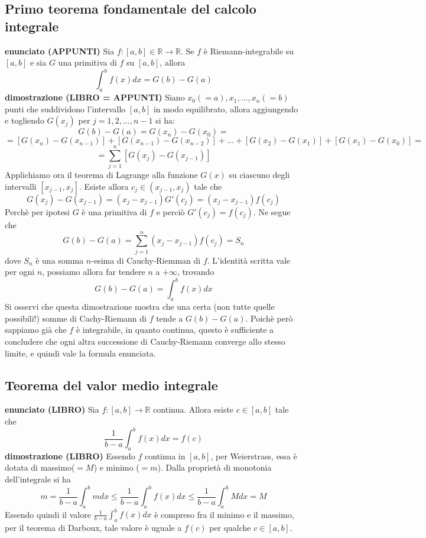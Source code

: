 \documentclass[a4paper, 9pt]{report}
\begin{document}
\newpage
\subsection*{Primo teorema fondamentale del calcolo integrale}
\textbf{enunciato (APPUNTI)}\newline
Sia $f : [a,b] \in \mathbb{R} \rightarrow \mathbb{R}$. Se $f$ è Riemann-integrabile su $[a,b]$ e sia $G$ una primitiva di $f$ su $[a,b]$, allora
\[
    \int_{a}^{b}f(x) dx = G(b)-G(a)
\]
\textbf{dimostrazione (LIBRO = APPUNTI)}\newline
Siano $x_0 (=a), x_1, \dots, x_n (=b)$ punti che suddividono l'intervallo $[a,b]$ in modo equilibrato, allora aggiungendo e togliendo $G(x_j)$ per $j = 1,2,\dots,n-1$ si ha:
\[
    G(b) - G(a) = G(x_n) - G(x_0) =
\]
\[
    = [G(x_n) - G(x_{n-1})] + [G(x_{n-1}) - G(x_{n-2})] + \dots + [G(x_2) - G(x_1)] + [G(x_1) - G(x_0)] =
\]
\[
    = \sum_{j=1}^{n} [G(x_j) - G(x_{j-1})]
\]
Applichiamo ora il teorema di Lagrange alla funzione $G(x)$ su ciascuno degli intervalli $[x_{j-1}, x_j]$. Esiste allora $c_j \in (x_{j-1}, x_j)$ tale che
\[
    G(x_j) - G(x_{j-1}) =(x_j - x_{j-1})G'(c_j) = (x_j - x_{j-1})f(c_j)
\]
Perchè per ipotesi $G$ è una primitiva di $f$ e perciò $G'(c_j) = f(c_j)$. Ne segue che 
\[
    G(b)-G(a) = \sum_{j=1}^{n}(x_j - x_{j-1})f(c_j) = S_n
\]
dove $S_n$ è una somma $n$-esima di Cauchy-Riemman di $f$. L'identità scritta vale per ogni $n$, possiamo allora far tendere $n$ a $+\infty$, trovando 
\[
    G(b) - G(a) = \int_{a}^{b}f(x)dx
\]
Si osservi che questa dimostrazione mostra che una certa (non tutte quelle possibili!) somme di Cachy-Riemann di $f$ tende a $G(b) - G(a)$. Poichè però sappiamo già che $f$ è integrabile, in quanto continua, questo è sufficiente a concludere che ogni altra successione di Cauchy-Riemann converge allo stesso limite, e quindi vale la formula enunciata.





\newpage
\subsection*{Teorema del valor medio integrale}
\textbf{enunciato (LIBRO)}\newline
Sia $f:[a,b] \rightarrow  \mathbb{R}$ continua. Allora esiste $c \in [a,b]$ tale che
\[
    \frac{1}{b-a}\int_{a}^{b}f(x) dx =f(c)
\]
\textbf{dimostrazione (LIBRO)}\newline
Essendo $f$ continua in $[a,b]$, per Weierstrass, essa è dotata di massimo($=M$) e minimo ($=m$). Dalla proprietà di monotonia dell'integrale si ha
\[
    m = \frac{1}{b-a} \int_{a}^{b} m dx \leq \frac{1}{b-a} \int_{a}^{b}f(x)dx \leq \frac{1}{b-a} \int_{a}^{b}M dx = M
\]
Essendo quindi il valore $\frac{1}{b-a} \int_{a}^{b}f(x)dx$ è compreso fra il minimo e il massimo, per il teorema di Darboux, tale valore è uguale a $f(c)$ per qualche $c \in[a,b]$.
\end{document}

